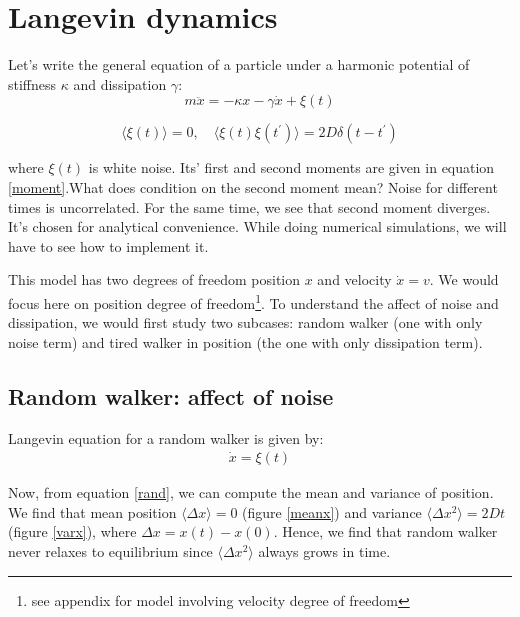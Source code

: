 \documentclass[11pt,a4paper]{article}
\begin{document}
\section{Langevin dynamics}

Let's write the general equation of a particle under a harmonic potential of stiffness $\kappa$ and dissipation $\gamma$:
\begin{equation}
m \ddot{x}= -\kappa x -\gamma \dot{x} + \xi(t)
\end{equation}

\begin{equation}
\langle \xi(t)\rangle=0, \quad \langle \xi(t) \xi(t^{\prime}) \rangle= 2 D \delta(t- t^{\prime})
\label{moment}
\end{equation}

where $\xi(t)$ is white noise. Its' first and second moments are given in equation \ref{moment}.What does condition on the second moment mean? Noise for different times is uncorrelated. For the same time, we see that second moment diverges. It's chosen for analytical convenience. While doing numerical simulations, we will have to see how to implement it.


This model has two degrees of freedom position $x$ and velocity $\dot{x}=v$. We would focus here on position degree of freedom\footnote{see appendix for model involving velocity degree of freedom}. To understand the affect of noise and dissipation, we would first study two subcases: random walker (one with only noise term) and tired walker in position (the one with only dissipation term). 


\subsection*{Random walker: affect of noise}
Langevin equation for a random walker is given by:
\begin{eqnarray}
\dot{x}=  \xi(t)
\label{rand}
\end{eqnarray}


Now, from equation \ref{rand}, we can compute the mean and variance of position. We find that mean position $\langle \Delta x\rangle=0$ (figure \ref{meanx}) and variance $\langle \Delta x ^2\rangle=2 Dt$ (figure \ref{varx}), where $\Delta x= x(t)-x(0)$. Hence, we find that random walker never relaxes to equilibrium since  $\langle \Delta x ^2\rangle$ always grows in time. 
\end{document}
